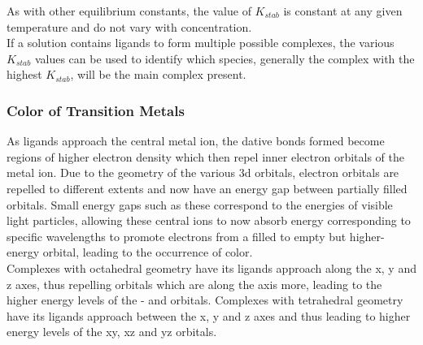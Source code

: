 \documentclass[../main]{subfiles}
\begin{document}

	As with other equilibrium constants, the value of \(K_{stab}\) is constant at any given temperature and do not vary with concentration.\\

	If a solution contains ligands to form multiple possible complexes, the various \(K_{stab}\) values can be used to identify which species, generally the complex with the highest \(K_{stab}\), will be the main complex present. 

	\subsubsection{Color of Transition Metals}

	As ligands approach the central metal ion, the dative bonds formed become regions of higher electron density which then repel inner electron orbitals of the metal ion. Due to the geometry of the various 3d orbitals, electron orbitals are repelled to different extents and now have an energy gap between partially filled orbitals. Small energy gaps such as these correspond to the energies of visible light particles, allowing these central ions to now absorb energy corresponding to specific wavelengths to promote electrons from a filled to empty but higher-energy orbital, leading to the occurrence of color. \\

	Complexes with octahedral geometry have its ligands approach along the x, y and z axes, thus repelling orbitals which are along the axis more, leading to the higher energy levels of the - and  orbitals. Complexes with tetrahedral geometry have its ligands approach between the x, y and z axes and thus leading to higher energy levels of the xy, xz and yz orbitals.
\end{document}
